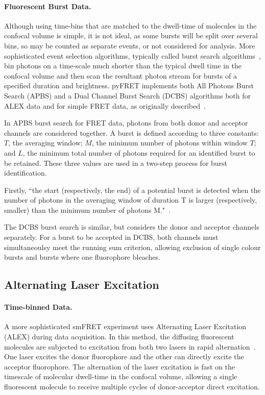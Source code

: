 \paragraph{Fluorescent Burst Data.}
Although using time-bins that are matched to the dwell-time of molecules in the confocal volume is simple, it is not ideal, as some bursts will be split over several bins, so may be counted as separate events, or not considered for analysis. More sophisticated event selection algorithms, typically called burst search algorithms~\cite{nir06}, bin photons on a time-scale much shorter than the typical dwell time in the confocal volume and then scan the resultant photon stream for bursts of a specified duration and brightness. pyFRET implements both All Photons Burst Search (APBS) and a Dual Channel Burst Search (DCBS) algorithms both for ALEX data and for simple FRET data, as originally described~\cite{nir06}.

In APBS burst search for FRET data, photons from both donor and acceptor channels are considered together. A burst is defined according to three constants: $T$, the averaging window; $M$, the minimum number of photons within window $T$; and $L$, the minimum total number of photons required for an identified burst to be retained. These three values are used in a two-step process for burst identification.

Firstly, ``the start (respectively, the end) of a potential burst is detected when the number of photons in the averaging window of duration T is larger (respectively, smaller) than the minimum number of photons M."~\cite{nir06}.

The DCBS burst search is similar, but considers the donor and acceptor channels separately. For a burst to be accepted in DCBS, both channels must simultaneoulsy meet the running sum criterion, allowing exclusion of single colour bursts and bursts where one fluorophore bleaches.

\subsection{Alternating Laser Excitation}
\paragraph{Time-binned Data.}
A more sophisticated smFRET experiment uses Alternating Laser Excitation (ALEX) during data acquisition. In this method, the diffusing fluorescent molecules are subjected to excitation from both two lasers in rapid alternation~\cite{kapanidis05}. One laser excites the donor fluorophore and the other can directly excite the acceptor fluorophore. The alternation of the laser excitation is fast on the timescale of molecular dwell-time in the confocal volume, allowing a single fluorescent molecule to receive multiple cycles of donor-acceptor direct excitation.

